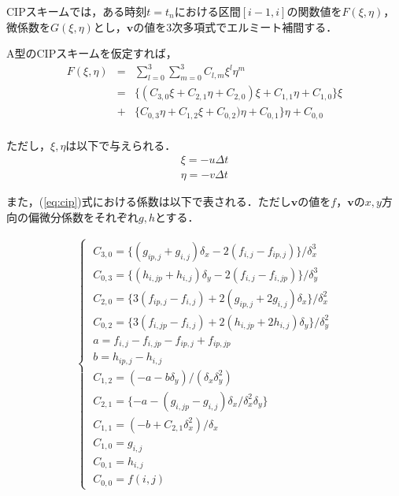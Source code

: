 \documentclass[twocolumn,oneside,a4paper]{article}
\begin{document}
CIPスキームでは，ある時刻$t=t_n$における区間$[i-1,i]$の関数値を$F(\xi,\eta)$，微係数を$G(\xi,\eta)$とし，$\bm v$の値を3次多項式でエルミート補間する．

A型のCIPスキームを仮定すれば，
\begin{eqnarray}\label{eq:cip}
F(\xi,\eta) &=& \sum_{l=0}^3 \sum_{m=0}^3 C_{l,m} \xi^l \eta^m \nonumber\\
&=& \{ ( C_{3,0} \xi + C_{2,1}\eta + C_{2,0}) \xi + C_{1,1}\eta + C_{1,0} \} \xi \nonumber\\
 &+& \{C_{0,3}\eta + C_{1,2}\xi + C_{0,2})\eta + C_{0,1}\} \eta + C_{0,0} \nonumber\\
\end{eqnarray}

ただし，$\xi,\eta$は以下で与えられる．
\begin{eqnarray*}
\xi =  -u \Delta t\\
\eta = -v \Delta t
\end{eqnarray*}

また，(\ref{eq:cip})式における係数は以下で表される．ただし$\bm v$の値を$f$，$\bm{v}$の$x,y$方向の偏微分係数をそれぞれ$g,h$とする．

\begin{eqnarray*}
\begin{cases}
\;C_{3,0} = \{ (g_{ip,j} + g_{i,j}) \delta_x - 2(f_{i,j}-f_{ip,j})\}/ \delta_x^3 \\
\;C_{0,3} = \{ (h_{i,jp} + h_{i,j}) \delta_y - 2(f_{i,j}-f_{i,jp})\}/ \delta_y^3 \\
\;C_{2,0} = \{ 3(f_{ip,j} - f_{i,j})  + 2(g_{ip,j}+2g_{i,j}) \delta_x \}/ \delta_x^2 \\
\;C_{0,2} = \{ 3(f_{i,jp} - f_{i,j})  + 2(h_{i,jp}+2h_{i,j}) \delta_y \}/ \delta_y^2 \\
\;a = f_{i,j} - f_{i,jp} - f_{ip,j} + f_{ip,jp} \\
\;b = h_{ip,j} - h_{i,j} \\
\;C_{1,2} = (-a-b\delta_y) / (\delta_x \delta_y^2)\\
\;C_{2,1} = \{  -a-(g_{i,jp} - g_{i,j})  \delta_x / \delta_x^2 \delta_y  \}\\
\;C_{1,1} = (-b+C_{2,1}\delta_x^2)/\delta_x\\
\;C_{1,0} = g_{i,j} \\
\;C_{0,1} = h_{i,j} \\
\;C_{0,0} = f(i,j)

\end{cases}  
\end{eqnarray*}
\end{document}
